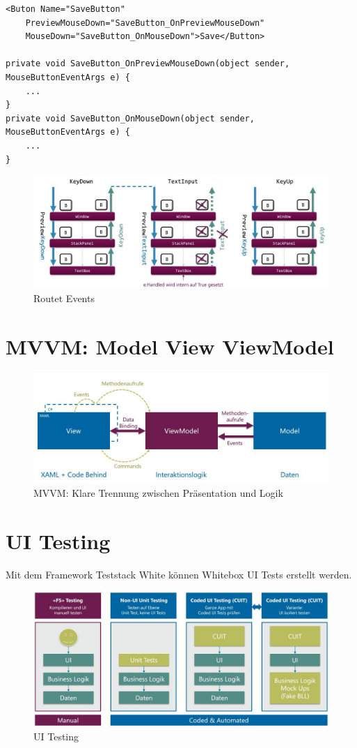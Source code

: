 \begin{lstlisting}[caption=Routet Events]
<Buton Name="SaveButton" 
	PreviewMouseDown="SaveButton_OnPreviewMouseDown"
	MouseDown="SaveButton_OnMouseDown">Save</Button>
	
private void SaveButton_OnPreviewMouseDown(object sender, MouseButtonEventArgs e) {
	...
}
private void SaveButton_OnMouseDown(object sender, MouseButtonEventArgs e) {
	...
}
\end{lstlisting}

\begin{figure}[h]
\centering
\includegraphics[width=0.7\linewidth]{images/routet_events}
\caption{Routet Events}
\label{fig:routetevents}
\end{figure}


\section{MVVM: Model View ViewModel}
\begin{figure}[h]
\centering
\includegraphics[width=0.7\linewidth]{images/mvvm}
\caption{MVVM: Klare Trennung zwischen Präsentation und Logik}
\label{fig:mvvm}
\end{figure}


\section{UI Testing}
Mit dem Framework Teststack White können Whitebox UI Tests erstellt werden. 
\begin{figure}[h]
\centering
\includegraphics[width=0.7\linewidth]{images/ui_testing}
\caption{UI Testing}
\label{fig:uitesting}
\end{figure}






